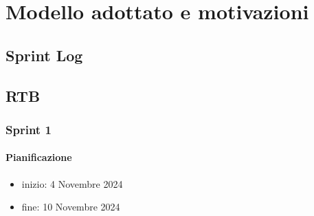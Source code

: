 \documentclass{article}
\begin{document}
\section{Modello adottato e motivazioni}
    \subsection{Sprint Log}
        \subsection{RTB}
            \subsubsection{Sprint 1}
                \paragraph{Pianificazione}
                \begin{itemize}
                    \item inizio: 4 Novembre 2024
                    \item fine: 10 Novembre 2024
                \end{itemize}

\end{document}
